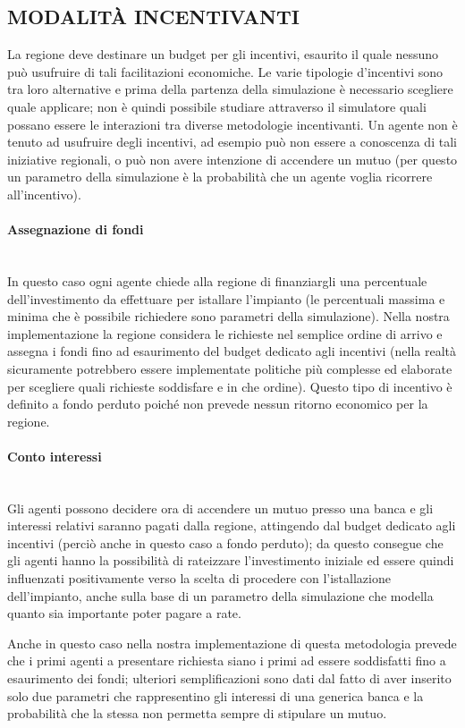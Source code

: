 \documentclass[12pt,a4paper,openright,twoside]{report}
\newcommand{\myparagraph}[1]{\paragraph{#1}\mbox{}\\}
\begin{document}
\subsection{MODALITÀ INCENTIVANTI}

La regione deve destinare un budget per gli incentivi, esaurito il quale nessuno può usufruire di tali facilitazioni economiche. Le varie tipologie d’incentivi sono tra loro alternative e prima della partenza della simulazione è necessario scegliere quale applicare; non è quindi possibile studiare attraverso il simulatore quali possano essere le interazioni tra diverse metodologie incentivanti. Un agente non è tenuto ad usufruire degli incentivi, ad esempio può non essere a conoscenza di tali iniziative regionali, o può non avere intenzione di accendere un mutuo (per questo un parametro della simulazione è la probabilità che un agente voglia ricorrere all’incentivo).

\myparagraph{Assegnazione di fondi}

In questo caso ogni agente chiede alla regione di finanziargli una percentuale dell'investimento da effettuare per istallare l'impianto (le percentuali massima e minima che è possibile richiedere sono parametri della simulazione). Nella nostra implementazione la regione considera le richieste nel semplice ordine di arrivo e assegna i fondi fino ad esaurimento del budget dedicato agli incentivi (nella realtà sicuramente potrebbero essere implementate politiche più complesse ed elaborate per scegliere quali richieste soddisfare e in che ordine). Questo tipo di incentivo è definito a fondo perduto poiché non prevede nessun ritorno economico per la regione.

\myparagraph{Conto interessi}

Gli agenti possono decidere ora di accendere un mutuo presso una banca e gli interessi relativi saranno pagati dalla regione, attingendo dal budget dedicato agli incentivi (perciò anche in questo caso a fondo perduto); da questo consegue che gli agenti hanno la possibilità di rateizzare l'investimento iniziale ed essere quindi influenzati positivamente verso la scelta di procedere con l'istallazione dell'impianto, anche sulla base di un parametro della simulazione che modella quanto sia importante poter pagare a rate.

Anche in questo caso nella nostra implementazione di questa metodologia prevede che i primi agenti a presentare richiesta siano i primi ad essere soddisfatti fino a esaurimento dei fondi; ulteriori semplificazioni sono dati dal fatto di aver inserito solo due parametri che rappresentino gli interessi di una generica banca e la probabilità che la stessa non permetta sempre di stipulare un mutuo.
\end{document}

